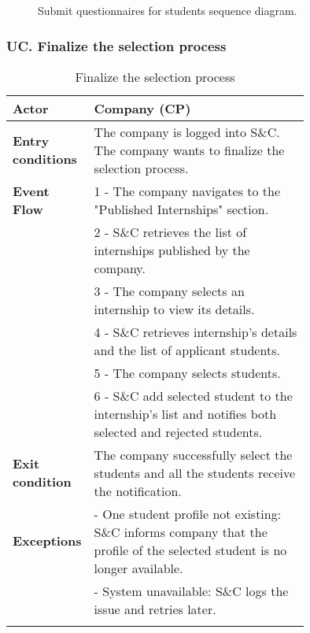 \begin{figure}[H]
    \begin{center}
        
        \caption{Submit questionnaires for students sequence diagram.}
        \label{fig:submit_questionnaires_for_students_seqd}%
    \end{center}
\end{figure}

\subsubsection*{UC\cuc . Finalize the selection process}
\begin{center}
    \begin{longtable}{|l|p{0.75\linewidth}|}
        \hline
        \textbf{Actor}            & Company (CP)\\
        \hline
        \textbf{Entry conditions} & The company is logged into S\&C. The company wants to finalize the selection process.\\
        \hline
        \textbf{Event Flow}    & 1 - The company navigates to the "Published                                                        Internships" section. \\
                                & 2 - S\&C retrieves the list of internships published by the company. \\
                                & 3 - The company selects an internship to view its details. \\
                                & 4 - S\&C retrieves internship's details and the list of applicant students.\\
                                & 5 - The company selects students.\\
                                & 6 - S\&C add selected student to the internship’s list and notifies both selected and rejected students.\\
        \hline
        \textbf{Exit condition}     & The company successfully select the students and all the students receive the notification.\\       
        \hline
        \textbf{Exceptions}     & - One student profile not existing: S\&C informs company that the profile of the selected student is no longer available.\\
                                & - System unavailable: S\&C logs the issue and retries later. \\
        \hline
        \caption{Finalize the selection process}
        \label{tab: finalize_the_selection_process_usecase}
    \end{longtable}
\end{center}

